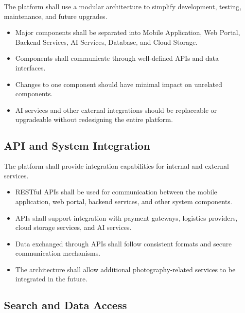 The platform shall use a modular architecture to simplify development,
testing, maintenance, and future upgrades.

\begin{itemize}
    \item Major components shall be separated into Mobile Application,
    Web Portal, Backend Services, AI Services, Database, and Cloud Storage.

    \item Components shall communicate through well-defined APIs and data
    interfaces.

    \item Changes to one component should have minimal impact on unrelated
    components.

    \item AI services and other external integrations should be replaceable
    or upgradeable without redesigning the entire platform.
\end{itemize}

\subsection{API and System Integration}

The platform shall provide integration capabilities for internal and external
services.

\begin{itemize}
    \item RESTful APIs shall be used for communication between the mobile
    application, web portal, backend services, and other system components.

    \item APIs shall support integration with payment gateways, logistics
    providers, cloud storage services, and AI services.

    \item Data exchanged through APIs shall follow consistent formats and
    secure communication mechanisms.

    \item The architecture shall allow additional photography-related
    services to be integrated in the future.
\end{itemize}

\subsection{Search and Data Access}

